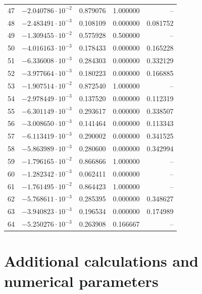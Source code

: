 \documentclass[11pt,reqno]{amsart}
\numberwithin{equation}{section}
\theoremstyle{plain}
\theoremstyle{definition}
\theoremstyle{remark}
\begin{document}
\begin{center}
\begin{longtable}{rrrrr}
47 & $-2.040786\cdot10^{-2}$ & 0.879076 & 1.000000 & --\\
48 & $-2.483491\cdot10^{-3}$ & 0.108109 & 0.000000 & 0.081752\\
49 & $-1.309455\cdot10^{-2}$ & 0.575928 & 0.500000 & --\\
50 & $-4.016163\cdot10^{-3}$ & 0.178433 & 0.000000 & 0.165228\\
51 & $-6.336008\cdot10^{-3}$ & 0.284303 & 0.000000 & 0.332129\\
52 & $-3.977664\cdot10^{-3}$ & 0.180223 & 0.000000 & 0.166885\\
53 & $-1.907514\cdot10^{-2}$ & 0.872540 & 1.000000 & --\\
54 & $-2.978449\cdot10^{-3}$ & 0.137520 & 0.000000 & 0.112319\\
55 & $-6.301149\cdot10^{-3}$ & 0.293617 & 0.000000 & 0.338507\\
56 & $-3.008650\cdot10^{-3}$ & 0.141464 & 0.000000 & 0.113343\\
57 & $-6.113419\cdot10^{-3}$ & 0.290002 & 0.000000 & 0.341525\\
58 & $-5.863989\cdot10^{-3}$ & 0.280600 & 0.000000 & 0.342994\\
59 & $-1.796165\cdot10^{-2}$ & 0.866866 & 1.000000 & --\\
60 & $-1.282342\cdot10^{-3}$ & 0.062411 & 0.000000 & --\\
61 & $-1.761495\cdot10^{-2}$ & 0.864423 & 1.000000 & --\\
62 & $-5.768611\cdot10^{-3}$ & 0.285395 & 0.000000 & 0.348627\\
63 & $-3.940823\cdot10^{-3}$ & 0.196534 & 0.000000 & 0.174989\\
64 & $-5.250276\cdot10^{-3}$ & 0.263908 & 0.166667 & --\\
\bottomrule
\end{longtable}
\end{center}

\section{Additional calculations and numerical parameters}
\label{sec:extension_calculations}
\end{document}
